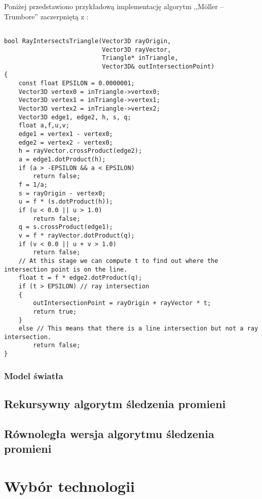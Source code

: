 Poniżej przedstawiono przykładową implementację algorytm ,,Möller – Trumbore'' zaczerpniętą z \cite{wikiMoll}:

\begin{lstlisting}

bool RayIntersectsTriangle(Vector3D rayOrigin, 
                           Vector3D rayVector, 
                           Triangle* inTriangle,
                           Vector3D& outIntersectionPoint)
{
    const float EPSILON = 0.0000001; 
    Vector3D vertex0 = inTriangle->vertex0;
    Vector3D vertex1 = inTriangle->vertex1;  
    Vector3D vertex2 = inTriangle->vertex2;
    Vector3D edge1, edge2, h, s, q;
    float a,f,u,v;
    edge1 = vertex1 - vertex0;
    edge2 = vertex2 - vertex0;
    h = rayVector.crossProduct(edge2);
    a = edge1.dotProduct(h);
    if (a > -EPSILON && a < EPSILON)
        return false;
    f = 1/a;
    s = rayOrigin - vertex0;
    u = f * (s.dotProduct(h));
    if (u < 0.0 || u > 1.0)
        return false;
    q = s.crossProduct(edge1);
    v = f * rayVector.dotProduct(q);
    if (v < 0.0 || u + v > 1.0)
        return false;
    // At this stage we can compute t to find out where the intersection point is on the line.
    float t = f * edge2.dotProduct(q);
    if (t > EPSILON) // ray intersection
    {
        outIntersectionPoint = rayOrigin + rayVector * t; 
        return true;
    }
    else // This means that there is a line intersection but not a ray intersection.
        return false;
}

\end{lstlisting}

\subsubsection{Model światła}
\subsection{Rekursywny algorytm śledzenia promieni}
\subsection{Równoległa wersja algorytmu śledzenia promieni}

\section{Wybór technologii}